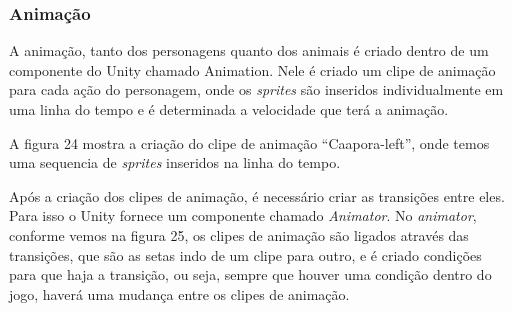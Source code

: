 \subsubsection{Animação}
A animação, tanto dos personagens quanto dos animais é criado dentro de um componente do Unity chamado Animation. Nele é criado um clipe de animação para cada ação do personagem, onde os \textit{sprites} são inseridos individualmente em uma linha do tempo e é determinada a velocidade que terá a animação.

A figura 24 mostra a criação do clipe de animação “Caapora-left”, onde temos uma sequencia de \textit{sprites} inseridos na linha do tempo.

\begin{figure}[h!]
		\centering
	\end{figure}


Após a criação dos clipes de animação, é necessário criar as transições entre eles. Para isso o Unity fornece um componente chamado \textit{Animator}. No \textit{animator}, conforme vemos na figura 25, os clipes de animação são ligados através das transições, que são as setas indo de um clipe para outro, e é criado condições para que haja a transição, ou seja, sempre que houver uma condição dentro do jogo, haverá uma mudança entre os clipes de animação.
	
\pagebreak

\begin{figure}[h!]
		\centering
	\end{figure}


